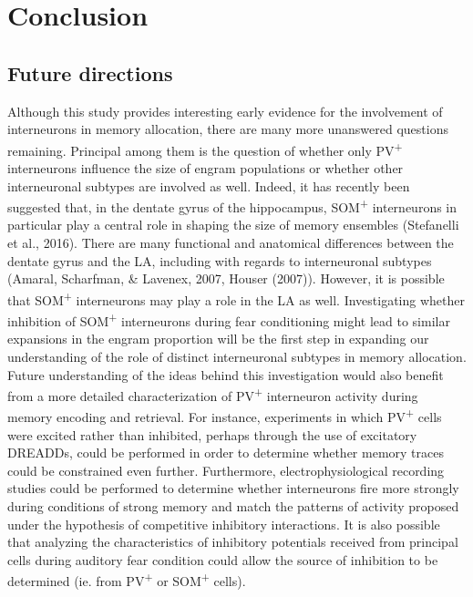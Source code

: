 \documentclass[12pt,a4paperpaper,]{report}
\begin{document}
\chapter{Conclusion}\label{conclusion}

\section{Future directions}\label{future-directions}

Although this study provides interesting early evidence for the
involvement of interneurons in memory allocation, there are many more
unanswered questions remaining. Principal among them is the question of
whether only PV\textsuperscript{+} interneurons influence the size of
engram populations or whether other interneuronal subtypes are involved
as well. Indeed, it has recently been suggested that, in the dentate
gyrus of the hippocampus, SOM\textsuperscript{+} interneurons in
particular play a central role in shaping the size of memory ensembles
(Stefanelli et al., 2016). There are many functional and anatomical
differences between the dentate gyrus and the LA, including with regards
to interneuronal subtypes (Amaral, Scharfman, \& Lavenex, 2007, Houser
(2007)). However, it is possible that SOM\textsuperscript{+}
interneurons may play a role in the LA as well. Investigating whether
inhibition of SOM\textsuperscript{+} interneurons during fear
conditioning might lead to similar expansions in the engram proportion
will be the first step in expanding our understanding of the role of
distinct interneuronal subtypes in memory allocation. Future
understanding of the ideas behind this investigation would also benefit
from a more detailed characterization of PV\textsuperscript{+}
interneuron activity during memory encoding and retrieval. For instance,
experiments in which PV\textsuperscript{+} cells were excited rather
than inhibited, perhaps through the use of excitatory DREADDs, could be
performed in order to determine whether memory traces could be
constrained even further. Furthermore, electrophysiological recording
studies could be performed to determine whether interneurons fire more
strongly during conditions of strong memory and match the patterns of
activity proposed under the hypothesis of competitive inhibitory
interactions. It is also possible that analyzing the characteristics of
inhibitory potentials received from principal cells during auditory fear
condition could allow the source of inhibition to be determined (ie.
from PV\textsuperscript{+} or SOM\textsuperscript{+} cells).
\end{document}
